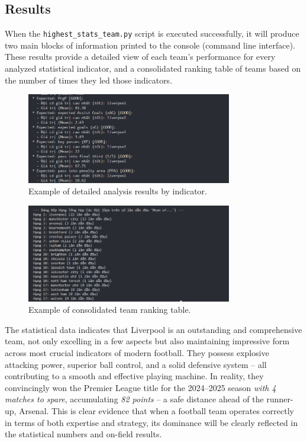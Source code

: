 \documentclass[12pt, a4paper]{report}
\begin{document}
\subsection{Results}
When the \texttt{highest\_stats\_team.py} script is executed successfully, it will produce two main blocks of information printed to the console (command line interface).
These results provide a detailed view of each team's performance for every analyzed statistical indicator, and a consolidated ranking table of teams based on the number of times they led those indicators.

\begin{figure}[H]
    \centering
    \includegraphics[width=0.8\textwidth]{output_2.4.1.png}
    \caption{Example of detailed analysis results by indicator.}
    \label{fig:analysis_output1}
\end{figure}

\begin{figure}[H]
    \centering
    \includegraphics[width=0.8\textwidth]{output_2.4.2.png}
    \caption{Example of consolidated team ranking table.}
    \label{fig:overall_ranking}
\end{figure}

The statistical data indicates that Liverpool is an outstanding and comprehensive team, not only excelling in a few aspects but also maintaining impressive form across most crucial indicators of modern football.
They possess explosive attacking power, superior ball control, and a solid defensive system – all contributing to a smooth and effective playing machine.
In reality, they convincingly won the Premier League title for the 2024–2025 season \textit{with 4 matches to spare}, accumulating \textit{82 points} – a safe distance ahead of the runner-up, Arsenal.
This is clear evidence that when a football team operates correctly in terms of both expertise and strategy, its dominance will be clearly reflected in the statistical numbers and on-field results.
\end{document}
